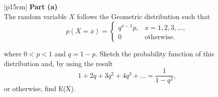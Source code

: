 \documentclass[a4paper,12pt]{article}
\begin{document}
 \begin{table}[ht!]
     \centering
     \begin{tabular}{|p{15cm}|}
     \hline        
 \noindent \textbf{Part (a)}\\
\noindent
The random variable $X$ follows the Geometric distribution such that
\[{\displaystyle p(X = x) ={\begin{cases}q^{x-1}p,&x = 1,2,3, ...,\\0&\mbox{otherwise.}\end{cases}}} 
\]

where $0 < p <1$ and $q = 1 - p$.  Sketch the probability function of this distribution and, by using the result 
\[1+2q + 3q^2 + 4q^3 + ... =  \frac{1}{1-q^2} ,\] or otherwise, find E(X).

\\ \hline
 \end{tabular}
\end{table}
\end{document}
